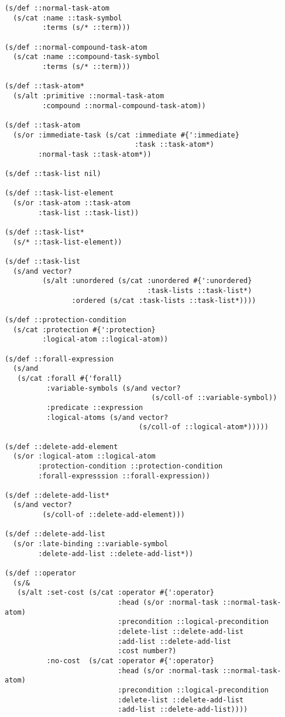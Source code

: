 \begin{lstlisting}
(s/def ::normal-task-atom
  (s/cat :name ::task-symbol
         :terms (s/* ::term)))

(s/def ::normal-compound-task-atom
  (s/cat :name ::compound-task-symbol
         :terms (s/* ::term)))

(s/def ::task-atom*
  (s/alt :primitive ::normal-task-atom
         :compound ::normal-compound-task-atom))

(s/def ::task-atom
  (s/or :immediate-task (s/cat :immediate #{':immediate}
                               :task ::task-atom*)
        :normal-task ::task-atom*))

(s/def ::task-list nil)

(s/def ::task-list-element
  (s/or :task-atom ::task-atom
        :task-list ::task-list))

(s/def ::task-list*
  (s/* ::task-list-element))

(s/def ::task-list
  (s/and vector?
         (s/alt :unordered (s/cat :unordered #{':unordered}
                                  :task-lists ::task-list*)
                :ordered (s/cat :task-lists ::task-list*))))

(s/def ::protection-condition
  (s/cat :protection #{':protection}
         :logical-atom ::logical-atom))

(s/def ::forall-expression
  (s/and
   (s/cat :forall #{'forall}
          :variable-symbols (s/and vector?
                                   (s/coll-of ::variable-symbol))
          :predicate ::expression
          :logical-atoms (s/and vector?
                                (s/coll-of ::logical-atom*)))))

(s/def ::delete-add-element
  (s/or :logical-atom ::logical-atom
        :protection-condition ::protection-condition
        :forall-expresssion ::forall-expression))

(s/def ::delete-add-list*
  (s/and vector?
         (s/coll-of ::delete-add-element)))

(s/def ::delete-add-list
  (s/or :late-binding ::variable-symbol
        :delete-add-list ::delete-add-list*))

(s/def ::operator
  (s/&
   (s/alt :set-cost (s/cat :operator #{':operator}
                           :head (s/or :normal-task ::normal-task-atom)
                           :precondition ::logical-precondition
                           :delete-list ::delete-add-list
                           :add-list ::delete-add-list
                           :cost number?)
          :no-cost  (s/cat :operator #{':operator}
                           :head (s/or :normal-task ::normal-task-atom)
                           :precondition ::logical-precondition
                           :delete-list ::delete-add-list
                           :add-list ::delete-add-list))))


\end{lstlisting}
